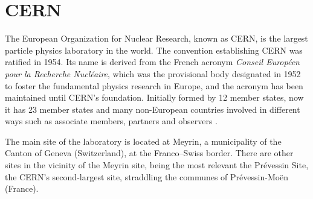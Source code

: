 \section{CERN}
The European Organization for Nuclear Research, known as CERN, is the largest particle physics laboratory in the
world. The convention establishing CERN was ratified in 1954.
Its name is derived from the French acronym \textit{Conseil Européen pour la Recherche Nucléaire}, which 
was the provisional body designated in 1952 to foster the fundamental physics research in Europe, and the 
acronym has been maintained until CERN's foundation.
Initially formed by 12 member states, now it has 23 member states and many non-European countries involved
in different ways such as associate members, partners and observers \cite{CERN_membersates}.

The main site of the laboratory is located at Meyrin, a municipality of the Canton of Geneva (Switzerland), 
at the Franco–Swiss border. There are other sites in the vicinity of the Meyrin site, being the most relevant %
the Prévessin Site, the CERN’s second-largest site, straddling the communes of Prévessin-Moën (France).

